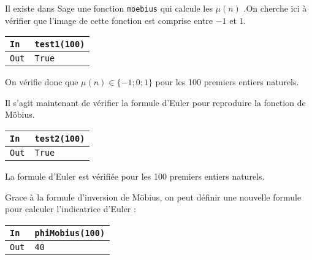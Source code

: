 \documentclass[titlepage]{article}
\begin{document}
            Il existe dans Sage une fonction \texttt{moebius} qui calcule les $\mu(n)$ .On cherche ici à vérifier que l'image de cette fonction est comprise entre $-1$ et $1$.

            

            \begin{tabularx}{12cm}{|p{0.60cm}|X|}
                \hline
                \rowcolor{gray}
                \texttt{In}
                & 
                \texttt{test1(100)}
                \\
                \hline
                \texttt{Out}
                &
                \texttt{True}
                \\
                \hline
            \end{tabularx}
            \bigbreak

            On vérifie donc que $\mu (n) \in \{-1;0;1\}$ pour les 100 premiers entiers naturels.
            \bigbreak

            Il s'agit maintenant de vérifier la formule d'Euler pour reproduire la fonction de Möbius.

            
            
            \begin{tabularx}{12cm}{|p{0.60cm}|X|}
                \hline
                \rowcolor{gray}
                \texttt{In}
                & 
                \texttt{test2(100)}
                \\
                \hline
                \texttt{Out}
                &
                \texttt{True}
                \\
                \hline
            \end{tabularx}
            \bigbreak
            
            La formule d'Euler est vérifiée pour les 100 premiers entiers naturels.
            \bigbreak
            
            Grace à la formule d'inversion de Möbius, on peut définir une nouvelle formule pour calculer l'indicatrice d'Euler : 

            

            \begin{tabularx}{12cm}{|p{0.60cm}|X|}
                \hline
                \rowcolor{gray}
                \texttt{In}
                & 
                \texttt{phiMobius(100)}
                \\
                \hline
                \texttt{Out}
                &
                \texttt{40}
                \\
                \hline
            \end{tabularx}
            \bigbreak
\end{document}
